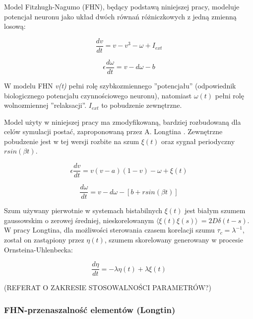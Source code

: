   Model Fitzhugh-Nagumo (FHN), będący podstawą niniejszej pracy, modeluje potencjał neuronu jako układ dwóch równań różniczkowych z jedną zmienną losową:

  \begin{equation}
    \frac{dv}{dt} = v - v^3 - \omega + I_{ext}
  \end{equation}

  \begin{equation}
    \epsilon \frac{d \omega}{dt} = v - d \omega - b
  \end{equation}

  W modelu FHN \emph{v(t)} pełni rolę szybkozmiennego ''potencjału'' (odpowiednik biologicznego potencjału czynnościowego neuronu), natomiast $\omega (t)$ pełni rolę wolnozmiennej ''relaksacji''. $I_{ext}$ to pobudzenie zewnętrzne.


  Model użyty w niniejszej pracy ma zmodyfikowaną, bardziej rozbudowaną dla celów symulacji postać, zaproponowaną przez A. Longtina \cite{longtin}. Zewnętrzne pobudzenie jest w tej wersji rozbite na szum $\xi(t)$ oraz sygnał periodyczny $r sin(\beta t)$.

  \begin{equation} \label{eq:v}
    \epsilon \frac{dv}{dt} = v(v-a)(1-v)- \omega + \xi(t)
  \end{equation}

  \begin{equation} \label{eq:w}
    \frac{d \omega}{dt} = v - d \omega - [b + r sin(\beta t)]
  \end{equation}

  Szum używany pierwotnie w systemach bistabilnych $\xi(t)$ jest białym szumem gaussowskim o zerowej średniej, nieskorelowanym $\langle \xi(t) \xi(s) \rangle\ = 2 D \delta (t-s)$. W pracy Longtina,  dla możliwości sterowania czasem korelacji szumu $\tau_c = \lambda^{-1}$, został on zastąpiony przez $\eta(t)$, szumem skorelowany generowany w procesie Ornsteina-Uhlenbecka:

  \begin{equation} \label{eq:eta}
    \frac{d \eta}{dt} = -\lambda \eta(t) + \lambda \xi(t)
  \end{equation}

  (REFERAT O ZAKRESIE STOSOWALNOŚCI PARAMETRÓW?)
  

  \subsubsection{FHN-przenaszalność elementów (Longtin)}

